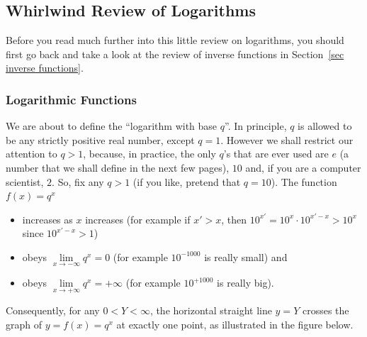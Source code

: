 \subsection*{Whirlwind Review of Logarithms}
Before you read much further into this little review on logarithms,
you should first go back and take a look at the review of inverse
functions in Section~\ref{sec inverse  functions}.
\subsubsection*{Logarithmic Functions}
We are about to define the ``logarithm with base $q$''.
In principle, $q$ is allowed to be any strictly positive real
number, except $q=1$. However we shall restrict our attention
to $q>1$, because, in practice, the only $q$'s that are ever
used are $e$ (a number that we shall define in the next few pages),
$10$ and, if you are a computer scientist, $2$.
So, fix any $q>1$ (if you like, pretend that $q=10$). The function
$f(x)=q^x$
\begin{itemize}
\item increases as $x$ increases (for example if $x'>x$, then
                          $10^{x'} = 10^x \cdot 10^{x'-x} >10^x$ since
                          $10^{x'-x}>1$)
\item obeys $\lim\limits_{x\rightarrow-\infty} q^x=0$ (for
                        example $10^{-1000}$ is really small) and
\item obeys $\lim\limits_{x\rightarrow+\infty} q^x=+\infty$ (for
                        example $10^{+1000}$ is really big).
\end{itemize}
Consequently, for any $0<Y<\infty$, the horizontal straight line
$y=Y$ crosses the graph of $y=f(x)=q^x$ at exactly one point,
as illustrated in the figure below.
